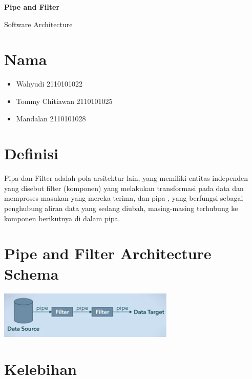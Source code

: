 \documentclass{article}
\begin{document}
	\begin{titlepage}
		\begin{center}
			\textbf{\huge Pipe and Filter}
			
			\vspace{0.5cm}
			
			{\large Software Architecture}
			
			\vspace{2.5cm}
			
			\section*{Nama}
			\begin{varwidth}{\textwidth}
				\begin{itemize}
					\item Wahyudi 2110101022
					\item Tommy Chitiawan 2110101025
					\item Mandalan 2110101028
				\end{itemize}
			\end{varwidth}
			
			
			
		\end{center}
		
	\end{titlepage}
	\section{Definisi}
	Pipa dan Filter adalah pola arsitektur lain, yang memiliki entitas independen yang disebut filter (komponen) yang melakukan transformasi pada data dan memproses masukan yang mereka terima, dan pipa , yang berfungsi sebagai penghubung aliran data yang sedang diubah, masing-masing terhubung ke komponen berikutnya di dalam pipa.
	
	\section{Pipe and Filter Architecture Schema
	}
	\includegraphics{../images/Capture.png}
	
	\section{Kelebihan}
	
\end{document}
